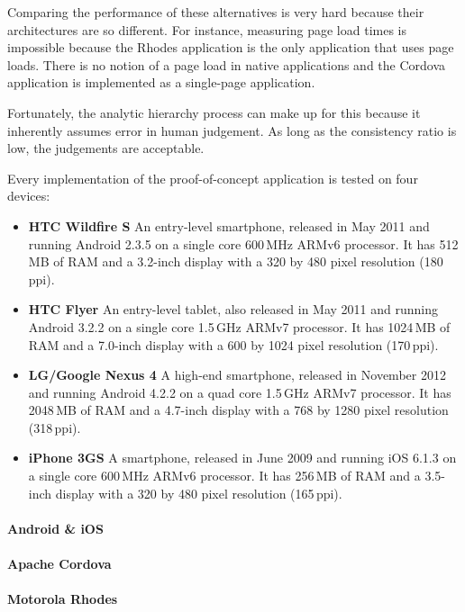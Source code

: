 Comparing the performance of these alternatives is very hard because their architectures are so different. For instance, measuring page load times is impossible because the Rhodes application is the only application that uses page loads. There is no notion of a page load in native applications and the Cordova application is implemented as a single-page application. 

Fortunately, the analytic hierarchy process can make up for this because it inherently assumes error in human judgement. As long as the consistency ratio is low, the judgements are acceptable.

Every implementation of the proof-of-concept application is tested on four devices:
\begin{itemize}
    \item \textbf{HTC Wildfire S} An entry-level smartphone, released in May 2011 and running Android 2.3.5 on a single core 600\,MHz ARMv6 processor. It has 512\,MB of RAM and a 3.2-inch display with a 320 by 480 pixel resolution (180\,ppi).
    \item \textbf{HTC Flyer} An entry-level tablet, also released in May 2011 and running Android 3.2.2 on a single core 1.5\,GHz ARMv7 processor. It has 1024\,MB of RAM and a 7.0-inch display with a 600 by 1024 pixel resolution (170\,ppi).
    \item \textbf{LG/Google Nexus 4} A high-end smartphone, released in November 2012 and running Android 4.2.2 on a quad core 1.5\,GHz ARMv7 processor. It has 2048\,MB of RAM and a 4.7-inch display with a 768 by 1280 pixel resolution (318\,ppi).
    \item \textbf{iPhone 3GS} A smartphone, released in June 2009 and running iOS 6.1.3 on a single core 600\,MHz ARMv6 processor. It has 256\,MB of RAM and a 3.5-inch display with a 320 by 480 pixel resolution (165\,ppi).
\end{itemize}

\paragraph{Android \& iOS} 

\paragraph{Apache Cordova} 

\paragraph{Motorola Rhodes} 

